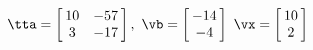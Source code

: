 {$\tta = \left[\hskip -3pt \begin{array}{cc} 10&-57\\  3&-17\end {array} \hskip -3pt
 \right],$
 \quad
$\vb =\left[\hskip -3pt \begin{array}{c} -14\\  -4\end {array} \hskip -3pt
 \right]$ 
}
{$\vx = \left[\hskip -3pt \begin{array}{c} 10\\  2\end{array}\hskip -3pt \right]$}
 